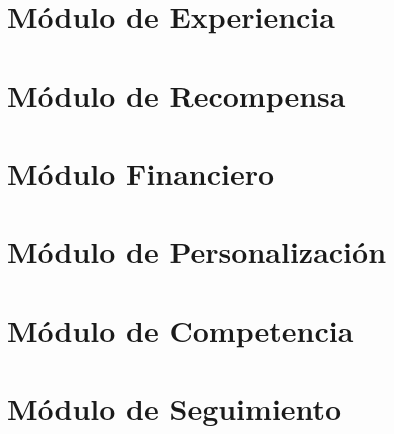
\part{Módulo de Experiencia}\label{mod:exp}
    

\part{Módulo de Recompensa}\label{mod:recomp}
\part{Módulo Financiero}\label{mod:financ}
\part{Módulo de Personalización}\label{mod:pers}
\part{Módulo de Competencia}\label{mod:comp}
\part{Módulo de Seguimiento}\label{mod:seguim}
